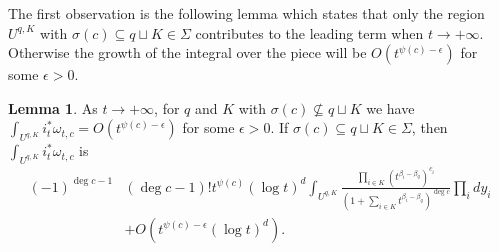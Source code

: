 \documentclass[11pt,reqno]{amsart}
\theoremstyle{definition}
\newtheorem{lemma}[theorem]{Lemma}
\numberwithin{equation}{section}
\begin{document}
The first observation is the following lemma which states that only the region $U^{q,K}$ with $\sigma(c)\subseteq q\sqcup K\in \Sigma$ contributes to the leading term when $t\rightarrow+\infty$. Otherwise the growth of the integral over the piece will be $O(t^{\psi(c)-\epsilon})$ for some $\epsilon>0$.

\smallskip


\begin{lemma}
	As $t\rightarrow +\infty$, for $q$ and $K$ with $\sigma(c)\not\subseteq q\sqcup K$ we have $\int_{U^{q,K}}i_t^*\omega_{t,c}=O(t^{\psi(c)-\epsilon})$ for some $\epsilon>0$. If $\sigma(c)\subseteq q\sqcup K\in \Sigma$, then $\int_{U^{q,K}}i_t^*\omega_{t,c}$ is
	\begin{align*}
		(-1)^{\deg c-1}&(\deg c-1)!t^{\psi(c)}(\log t)^d\int_{U^{q,K}}\frac{\prod_{i\in K}(t^{\beta_i-\beta_q})^{c_i}}{\left(1+\sum_{i\in K}t^{\beta_i-\beta_q}\right)^{\deg c}}\prod_{i}dy_i \\
		&+ O(t^{\psi(c)-\epsilon}(\log t)^d).
	\end{align*}
\end{lemma}
\end{document}
